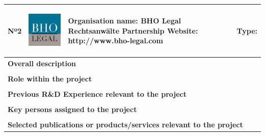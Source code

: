 \begin{longtable}[H]{|p{0.7cm}|p{4cm}|p{7cm}|p{1.3cm}|}
	\hline
	\begin{center} Nº2 \end{center} & \begin{center} \includegraphics[scale=0.4]{./logos/BHO-logo} \end{center} & \begin{center} \textbf{Organisation name:} BHO Legal Rechtsanwälte Partnership \newline \textbf{Website:} http://www.bho-legal.com \end{center} & \begin{center} Type: \end{center} \\ \hline
	
	\multicolumn{4}{|p{13cm}|}{\textbf{Overall description}}  \\ \hline
	
	\multicolumn{4}{|p{13cm}|}{}  \\ \hline
	
	\multicolumn{4}{|p{13cm}|}{\textbf{Role within the project}}   \\ \hline
	
	\multicolumn{4}{|p{13cm}|}{}  \\ \hline
	
	\multicolumn{4}{|p{13cm}|}{\textbf{Previous R\&D Experience relevant to the project}}  \\ \hline
	
	\multicolumn{4}{|p{13cm}|}{}  \\ \hline
	
	\multicolumn{4}{|p{13cm}|}{\textbf{Key persons assigned to the project}}   \\ \hline
	
	\multicolumn{4}{|p{13cm}|}{}  \\ \hline
	
	\multicolumn{4}{|p{13cm}|}{\textbf{Selected publications or products/services relevant to the project}}  \\ \hline
	

\end{longtable}
